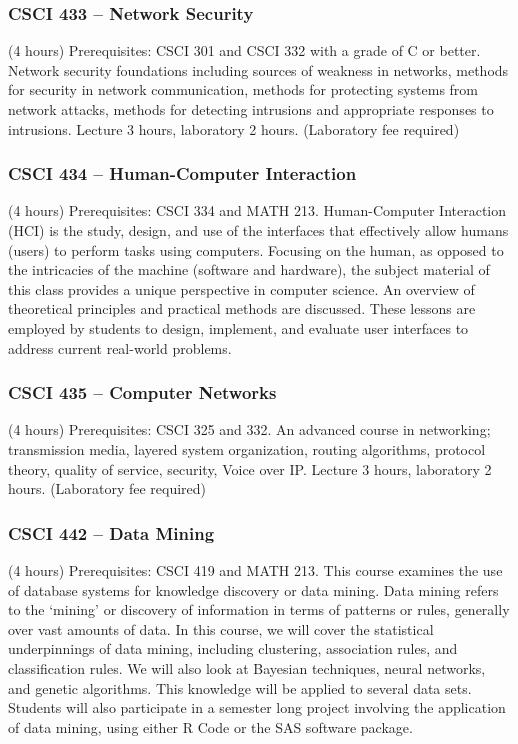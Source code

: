 \subsubsection{CSCI 433 -- Network Security}%
\label{course:CSCI:433}
(4 hours) Prerequisites: CSCI 301 and CSCI 332 with a grade of C or better. Network security foundations including sources of weakness in networks, methods for security in network communication, methods for protecting systems from network attacks, methods for detecting intrusions and appropriate responses to intrusions. Lecture 3 hours, laboratory 2 hours. (Laboratory fee required)

\subsubsection{CSCI 434 -- Human-Computer Interaction}%
\label{course:CSCI:434}
(4 hours) Prerequisites: CSCI 334 and MATH 213. Human-Computer Interaction (HCI) is the study, design, and use of the interfaces that effectively allow humans (users) to perform tasks using computers. Focusing on the human, as opposed to the intricacies of the machine (software and hardware), the subject material of this class provides a unique perspective in computer science. An overview of theoretical principles and practical methods are discussed. These lessons are employed by students to design, implement, and evaluate user interfaces to address current real-world problems.

\subsubsection{CSCI 435 -- Computer Networks}%
\label{course:CSCI:435}
(4 hours) Prerequisites: CSCI 325 and 332. An advanced course in networking; transmission media, layered system organization, routing algorithms, protocol theory, quality of service, security, Voice over IP. Lecture 3 hours, laboratory 2 hours. (Laboratory fee required)

\subsubsection{CSCI 442 -- Data Mining}%
\label{course:CSCI:442}
(4 hours) Prerequisites: CSCI 419 and MATH 213. This course examines the use of database systems for knowledge discovery or data mining. Data mining refers to the ‘mining’ or discovery of information in terms of patterns or rules, generally over vast amounts of data. In this course, we will cover the statistical underpinnings of data mining, including clustering, association rules, and classification rules. We will also look at Bayesian techniques, neural networks, and genetic algorithms. This knowledge will be applied to several data sets. Students will also participate in a semester long project involving the application of data mining, using either R Code or the SAS software package.

